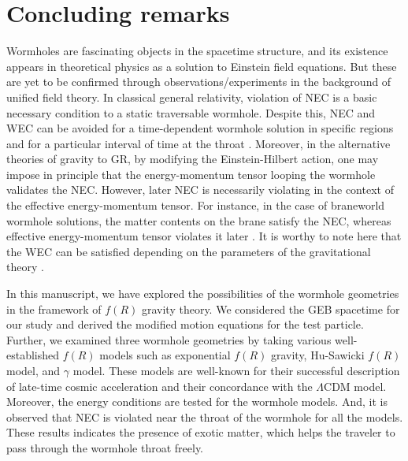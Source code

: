 \section{Concluding remarks}\label{sec7}

Wormholes are fascinating objects in the spacetime structure, and its existence appears in theoretical physics as a solution to Einstein field equations. But these are yet to be confirmed through observations/experiments in the background of unified field theory. In classical general relativity, violation of NEC is a basic necessary condition to a static traversable wormhole. Despite this, NEC and WEC can be avoided for a time-dependent wormhole solution in specific regions and for a particular interval of time at the throat \cite{ref84,ref85,ref86,ref87}. Moreover, in the alternative theories of gravity to GR, by modifying the Einstein-Hilbert action, one may impose in principle that the energy-momentum tensor looping the wormhole validates the NEC. However, later NEC is necessarily violating in the context of the effective energy-momentum tensor. For instance, in the case of braneworld wormhole solutions, the matter contents on the brane satisfy the NEC, whereas effective energy-momentum tensor violates it later \cite{ref43,ref44,ref45,ref46}.
It is worthy to note here that the WEC can be satisfied depending on the parameters of the gravitational theory \cite{ref41}.

In this manuscript, we have explored the possibilities of the wormhole geometries in the framework of $f(R)$ gravity theory. We considered the GEB spacetime for our study and derived the modified motion equations for the test particle. Further, we examined three wormhole geometries by taking various well-established $f(R)$ models such as exponential $f(R)$ gravity, Hu-Sawicki $f(R)$ model, and $\gamma$ model. These models are well-known for their successful description of late-time cosmic acceleration and their concordance with the $\Lambda$CDM model. Moreover, the energy conditions are tested for the wormhole models. And, it is observed that NEC is violated near the throat of the wormhole for all the models. These results indicates the presence of exotic matter, which helps the traveler to pass through the wormhole throat freely.

